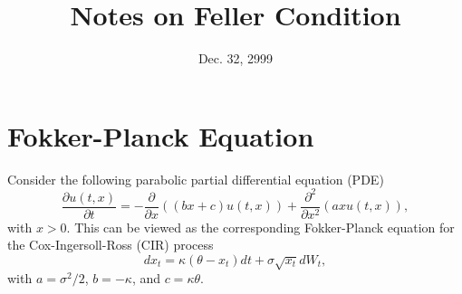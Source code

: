 \documentclass[12pt]{article}
\begin{document}
\title{Notes on Feller Condition}
\date{Dec. 32, 2999}

\maketitle

\section{Fokker-Planck Equation}

  Consider the following parabolic partial differential equation (PDE) \cite{Feller}
  \begin{equation}
    \frac{\partial u(t,x)}{\partial t} = -\frac{\partial}{\partial x}\left((bx+c)u(t,x)\right)
                                       + \frac{\partial^2}{\partial x^2}\left(axu(t,x)\right),
    \label{FP}
  \end{equation}
  with $x>0$. This can be viewed as the corresponding Fokker-Planck equation for the Cox-Ingersoll-Ross (CIR)
  process
  \begin{equation}
    dx_t=\kappa(\theta-x_t)dt + \sigma\sqrt{x_t}dW_t,
  \end{equation}
  with $a=\sigma^2/2$, $b=-\kappa$, and $c=\kappa\theta$.
\end{document}

